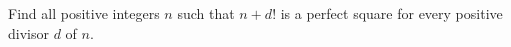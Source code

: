 Find all positive integers $n$ such that $n+d!$ is a perfect square for every positive divisor $d$ of $n$.
